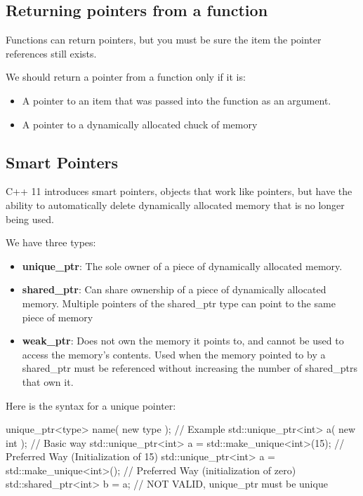 \documentclass{report}
\begin{document}
    \bigbreak \noindent 
    \subsection{Returning pointers from a function}
    \bigbreak \noindent 
    \begin{concept}
 Functions can return pointers, but you must be sure the item the pointer references still exists.
	\end{concept}
    \bigbreak \noindent 
    We should return  a pointer from a function only if it is:
    \begin{itemize}
        \item A pointer to an item that was passed into the function as an argument.
        \item A pointer to a dynamically allocated chuck of memory
    \end{itemize}

    \bigbreak \noindent 
    \subsection{Smart Pointers}
    \bigbreak \noindent 
    \begin{concept}
 C++ 11 introduces smart pointers, objects that work like pointers, but have the ability to automatically delete dynamically allocated memory that is no longer being used.
	\end{concept}
    \bigbreak \noindent 
    We have three types:
    \begin{itemize}
        \item \textbf{unique\_ptr}: The sole owner of a piece of dynamically allocated memory. 
        \item \textbf{shared\_ptr}: Can share ownership of a piece of dynamically allocated memory. Multiple pointers of the shared\_ptr type can point to the same piece of memory
        \item \textbf{weak\_ptr}: Does not own the memory it points to, and cannot be used to access the memory's contents. Used when the memory pointed to by a shared\_ptr must be referenced without increasing the number of shared\_ptrs that own it.
    \end{itemize}
    \bigbreak \noindent 

    \pagebreak
    Here is the syntax for a unique pointer:
    \bigbreak \noindent 
    
    \begin{cppcode}
unique_ptr<type> name( new type );
// Example
std::unique_ptr<int> a( new int ); // Basic way 
std::unique_ptr<int> a = std::make_unique<int>(15); // Preferred Way (Initialization of 15)
std::unique_ptr<int> a = std::make_unique<int>(); // Preferred Way (initialization of zero)
std::shared_ptr<int> b = a; //  NOT VALID, unique_ptr must be unique
    \end{cppcode}
    
\end{document}
